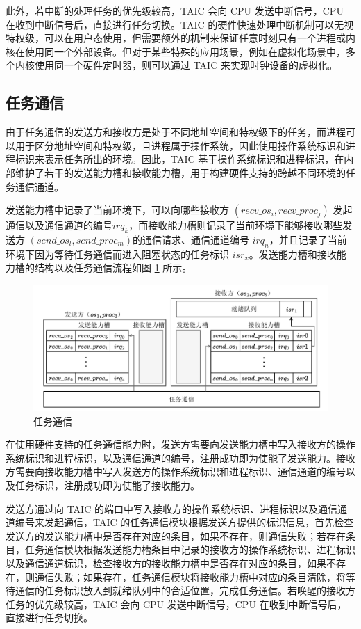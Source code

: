 此外，若中断的处理任务的优先级较高，TAIC 会向 CPU 发送中断信号，CPU 在收到中断信号后，直接进行任务切换。TAIC 的硬件快速处理中断机制可以无视特权级，可以在用户态使用，但需要额外的机制来保证任意时刻只有一个进程或内核在使用同一个外部设备。但对于某些特殊的应用场景，例如在虚拟化场景中，多个内核使用同一个硬件定时器，则可以通过 TAIC 来实现时钟设备的虚拟化。

\subsection{任务通信}
\label{section:communication}

由于任务通信的发送方和接收方是处于不同地址空间和特权级下的任务，而进程可以用于区分地址空间和特权级，且进程属于操作系统，因此使用操作系统标识和进程标识来表示任务所出的环境。因此，TAIC 基于操作系统标识和进程标识，在内部维护了若干的发送能力槽和接收能力槽，用于构建硬件支持的跨越不同环境的任务通信通道。

发送能力槽中记录了当前环境下，可以向哪些接收方 $(recv\_os_{i}, recv\_proc_{j})$ 发起通信以及通信通道的编号$irq_{k}$，而接收能力槽则记录了当前环境下能够接收哪些发送方 $(send\_os_{l}, send\_proc_{m})$的通信请求、通信通道编号 $irq_{n}$，并且记录了当前环境下因为等待任务通信而进入阻塞状态的任务标识 $isr_{x}$。发送能力槽和接收能力槽的结构以及任务通信流程如图 \ref{figure:communication} 所示。

\begin{figure}[htbp]
  \centering
  \includegraphics[width=\textwidth]{figures/pdfs/communication.pdf}
  \caption{任务通信}
  \label{figure:communication}
\end{figure}

在使用硬件支持的任务通信能力时，发送方需要向发送能力槽中写入接收方的操作系统标识和进程标识，以及通信通道的编号，注册成功即为使能了发送能力。接收方需要向接收能力槽中写入发送方的操作系统标识和进程标识、通信通道的编号以及任务标识，注册成功即为使能了接收能力。

发送方通过向 TAIC 的端口中写入接收方的操作系统标识、进程标识以及通信通道编号来发起通信，TAIC 的任务通信模块根据发送方提供的标识信息，首先检查发送方的发送能力槽中是否存在对应的条目，如果不存在，则通信失败；若存在条目，任务通信模块根据发送能力槽条目中记录的接收方的操作系统标识、进程标识以及通信通道标识，检查接收方的接收能力槽中是否存在对应的条目，如果不存在，则通信失败；如果存在，任务通信模块将接收能力槽中对应的条目清除，将等待通信的任务标识放入到就绪队列中的合适位置，完成任务通信。若唤醒的接收方任务的优先级较高，TAIC 会向 CPU 发送中断信号，CPU 在收到中断信号后，直接进行任务切换。

